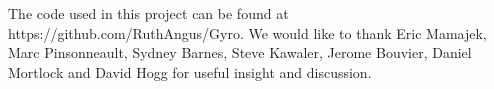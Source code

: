 \documentclass[10pt,preprint]{aastex}
\begin{document}
The code used in this project can be found at https://github.com/RuthAngus/Gyro.
We would like to thank Eric Mamajek, Marc Pinsonneault, Sydney Barnes, Steve Kawaler, Jerome Bouvier, Daniel Mortlock and David Hogg for useful insight and discussion.



\end{document}
